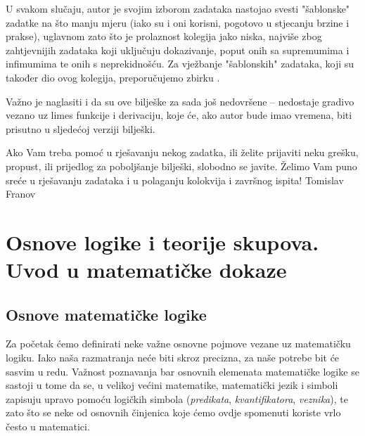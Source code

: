 \documentclass{book}
\theoremstyle{definition}
\theoremstyle{definition}
\theoremstyle{remark}
\begin{document}
U svakom slučaju, autor je svojim izborom zadataka nastojao svesti "šablonske" zadatke na što manju mjeru (iako su i oni korisni, pogotovo u stjecanju brzine i prakse), uglavnom zato što je prolaznost kolegija jako niska, najviše zbog zahtjevnijih zadataka koji uključuju dokazivanje, poput onih sa supremumima i infimumima te onih s neprekidnošću. Za vježbanje "šablonskih" zadataka, koji su također dio ovog kolegija, preporučujemo zbirku \cite{8}.

Važno je naglasiti i da su ove bilješke za sada još nedovršene -- nedostaje gradivo vezano uz limes funkcije i derivaciju, koje će, ako autor bude imao vremena, biti prisutno u sljedećoj verziji bilješki.

Ako Vam treba pomoć u rješavanju nekog zadatka, ili želite prijaviti neku grešku, propust, ili prijedlog za poboljšanje bilješki, slobodno se javite. Želimo Vam puno sreće u rješavanju zadataka i u polaganju kolokvija i završnog ispita!
\flushright
\flushleft
\justifying
\noindent Tomislav Franov
\thispagestyle{empty}
\large
\pagestyle{fancy}
\fancyhead[RO, RE]{}
\chapter{Osnove logike i teorije skupova. Uvod u matematičke dokaze}
\section{Osnove matematičke logike}
Za početak ćemo definirati neke važne osnovne pojmove vezane uz matematičku logiku. Iako naša razmatranja neće biti skroz precizna, za naše potrebe bit će sasvim u redu. Važnost poznavanja bar osnovnih elemenata matematičke logike se sastoji u tome da se, u velikoj većini matematike, matematički jezik i simboli zapisuju upravo pomoću logičkih simbola (\textit{predikata}, \textit{kvantifikatora}, \textit{veznika}), te zato što se neke od osnovnih činjenica koje ćemo ovdje spomenuti koriste vrlo često u matematici.
\end{document}
